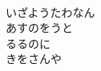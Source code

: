 \documentclass[10pt,b5j]{tarticle} %
\begin{document}
\begin{enumerate}
\begin{minipage}[c]{\blocksize}
        \vspace{\linespace}
        \item~\\
        いざようたわなん\\
        あすのをうと\\
        るるのに\\
        きをさんや
    
    \end{minipage}
\end{enumerate} %
\end{document}

